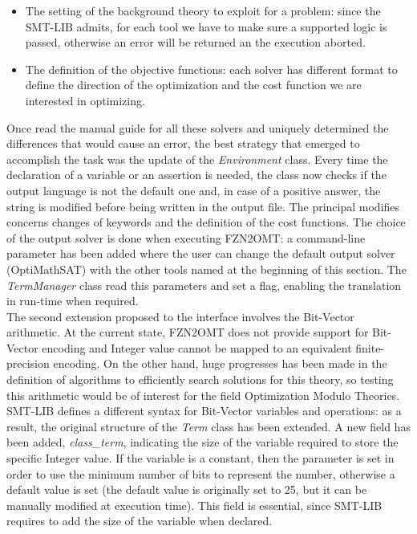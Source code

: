 \begin{itemize}
    \item The setting of the background theory to exploit for a problem: since the SMT-LIB admits, for each tool we have to make sure a supported logic is passed, otherwise an error will be returned an the execution aborted. 
    \item The definition of the objective functions: each solver has different format to define the direction of the optimization and the cost function we are interested in optimizing.
\end{itemize}

Once read the manual guide for all these solvers and uniquely determined the differences that would cause an error, the best strategy that emerged to accomplish the task was the update of the \textit{Environment} class. Every time the declaration of a variable or an assertion is needed, the class now checks if the output language is not the default one and, in case of a positive answer, the string is modified before being written in the output file. The principal modifies concerns changes of keywords and the definition of the cost functions. The choice of the output solver is done when executing FZN2OMT: a command-line parameter has been added where the user can change the default output solver (OptiMathSAT) with the other tools named at the beginning of this section. The \textit{TermManager} class read this parameters and set a flag, enabling the translation in run-time when required.\\
The second extension proposed to the interface involves the Bit-Vector arithmetic. At the current state, FZN2OMT does not provide support for Bit-Vector encoding and Integer value cannot be mapped to an equivalent finite-precision encoding. On the other hand, huge progresses has been made in the definition of algorithms to efficiently search solutions for this theory, so testing this arithmetic would be of interest for the field Optimization Modulo Theories. SMT-LIB defines a different syntax for Bit-Vector variables and operations: as a result, the original structure of the \textit{Term} class has been extended. A new field has been added, \textit{class\_term}, indicating the size of the variable required to store the specific Integer value. If the variable is a constant, then the parameter is set in order to use the minimum number of bits to represent the number, otherwise a default value is set (the default value is originally set to 25, but it can be manually modified at execution time). This field is essential, since SMT-LIB requires to add the size of the variable when declared. \\
